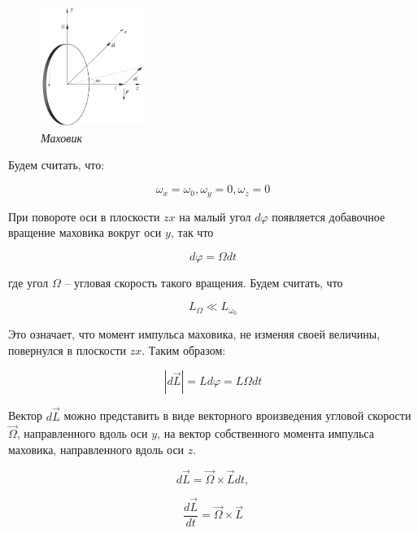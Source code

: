 \documentclass[a4paper,12pt]{article}
\begin{document}
\begin{figure}[h!]
        \centering
	\includegraphics[width=0.3\textwidth]{mahovik.png}
	\caption{\textit{Маховик}}
	\label{machovik}
\end{figure}

Будем считать, что:

\begin{equation}
    \omega_{x} = \omega_{0}, \omega_{y} = 0, \omega_{z} = 0
\end{equation}

При повороте оси в плоскости $zx$ на малый угол $d \varphi$ появляется добавочное вращение маховика вокруг оси $y$, так что

\begin{equation}
    d \varphi = \Omega dt
\end{equation}

где угол $\Omega$ -- угловая скорость такого вращения. Будем считать, что

\begin{equation}\label{condition-9}
    L_{\Omega} \ll L_{\omega_{0}}
\end{equation}

Это означает, что момент импульса маховика, не изменяя своей величины, повернулся в плоскости $zx$. Таким образом:

\begin{equation}
    \left | d \vec{L} \right | = L d \varphi = L \Omega dt
\end{equation}

Вектор $d \vec{L}$ можно представить в виде векторного вроизведения угловой скорости $\vec{\Omega}$, направленного вдоль оси $y$, на вектор собственного момента импульса маховика, направленного вдоль оси $z$.

\begin{equation}
    d \vec{L} = \vec{\Omega} \times \vec{L} dt,
\end{equation}

\begin{equation}
    \frac{d \vec{L}}{dt} = \vec{\Omega} \times \vec{L}
\end{equation}
\end{document}
